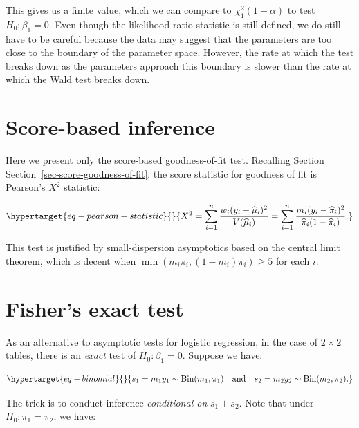 \documentclass[
  11pt,
  letterpaper,
  oneside]{book}
\theoremstyle{plain}
\theoremstyle{plain}
\theoremstyle{definition}
\theoremstyle{definition}
\theoremstyle{plain}
\theoremstyle{remark}
\begin{document}
This gives us a finite value, which we can compare to
\(\chi^2_{1}(1-\alpha)\) to test \(H_0: \beta_1 = 0\). Even though the
likelihood ratio statistic is still defined, we do still have to be
careful because the data may suggest that the parameters are too close
to the boundary of the parameter space. However, the rate at which the
test breaks down as the parameters approach this boundary is slower than
the rate at which the Wald test breaks down.

\hypertarget{sec-score-based-inference}{%
\section{Score-based inference}\label{sec-score-based-inference}}

Here we present only the score-based goodness-of-fit test. Recalling
Section Section~\ref{sec-score-goodness-of-fit}, the score statistic for
goodness of fit is Pearson's \(X^2\) statistic:

\begin{equation}\protect\hypertarget{eq-pearson-statistic}{}{
X^2 = \sum_{i = 1}^n \frac{w_i (y_i - \widehat \mu_i)^2}{V(\widehat \mu_i)} = \sum_{i = 1}^n \frac{m_i(y_i - \widehat \pi_i)^2}{\widehat \pi_i(1-\widehat \pi_i)}.
}\label{eq-pearson-statistic}\end{equation}

This test is justified by small-dispersion asymptotics based on the
central limit theorem, which is decent when
\(\min(m_i \pi_i, (1-m_i)\pi_i) \geq 5\) for each \(i\).

\hypertarget{sec-fisher-exact-test}{%
\section{Fisher's exact test}\label{sec-fisher-exact-test}}

As an alternative to asymptotic tests for logistic regression, in the
case of \(2 \times 2\) tables, there is an \emph{exact} test of
\(H_0: \beta_1 = 0\). Suppose we have:

\begin{equation}\protect\hypertarget{eq-binomial}{}{
s_1 = m_1y_1 \sim \text{Bin}(m_1, \pi_1) \quad \text{and} \quad s_2 = m_2y_2 \sim \text{Bin}(m_2, \pi_2).
}\label{eq-binomial}\end{equation}

The trick is to conduct inference \emph{conditional on} \(s_1 + s_2\).
Note that under \(H_0: \pi_1 = \pi_2\), we have:
\end{document}
